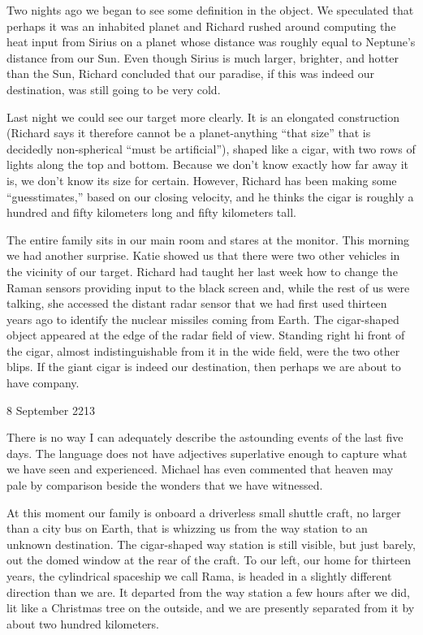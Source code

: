 \documentclass[]{article}
\begin{document}
{Two nights ago we began to see some definition in the object. We speculated that perhaps it was an inhabited planet and Richard rushed around computing the heat input from Sirius on a planet whose distance was roughly equal to Neptune’s distance from our Sun. Even though Sirius is much larger, brighter, and hotter than the Sun, Richard concluded that our paradise, if this was indeed our destination, was still going to be very cold.

Last night we could see our target more clearly. It is an elongated construction (Richard says it therefore cannot be a planet-anything “that size” that is decidedly non-spherical “must be artificial”), shaped like a cigar, with two rows of lights along the top and bottom. Because we don’t know exactly how far away it is, we don’t know its size for certain. However, Richard has been making some “guesstimates,” based on our closing velocity, and he thinks the cigar is roughly a hundred and fifty kilometers long and fifty kilometers tall.

The entire family sits in our main room and stares at the monitor. This morning we had another surprise. Katie showed us that there were two other vehicles in the vicinity of our target. Richard had taught her last week how to change the Raman sensors providing input to the black screen and, while the rest of us were talking, she accessed the distant radar sensor that we had first used thirteen years ago to identify the nuclear missiles coming from Earth. The cigar-shaped object appeared at the edge of the radar field of view. Standing right hi front of the cigar, almost indistinguishable from it in the wide field, were the two other blips. If the giant cigar is indeed our destination, then perhaps we are about to have company.

8 September 2213

There is no way I can adequately describe the astounding events of the last five days. The language does not have adjectives superlative enough to capture what we have seen and experienced. Michael has even commented that heaven may pale by comparison beside the wonders that we have witnessed.

At this moment our family is onboard a driverless small shuttle craft, no larger than a city bus on Earth, that is whizzing us from the way station to an unknown destination. The cigar-shaped way station is still visible, but just barely, out the domed window at the rear of the craft. To our left, our home for thirteen years, the cylindrical spaceship we call Rama, is headed in a slightly different direction than we are. It departed from the way station a few hours after we did, lit like a Christmas tree on the outside, and we are presently separated from it by about two hundred kilometers.

}
\end{document}
